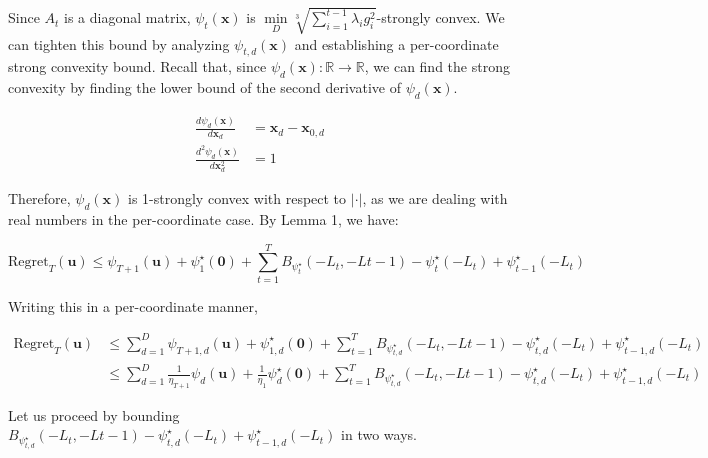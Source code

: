 \documentclass{article}
\newcommand{\R}{\mathbb{R}}
\newcommand{\Regret}{\text{Regret}}
\newcommand{\bx}{\mathbf{x}}
\newcommand{\bu}{\mathbf{u}}
\begin{document}
Since $A_t$ is a diagonal matrix, $\psi_t(\bx)$ is $\min\limits_{D} \sqrt[3]{\sum\limits_{i=1}^{t-1} \lambda_i
g_{i}^2}$-strongly convex. We can tighten this bound by analyzing $\psi_{t,d}(\bx)$ and establishing a per-coordinate
strong convexity bound. Recall that, since $\psi_d(\bx): \R \rightarrow \R$, we can find the strong convexity by finding
the lower bound of the second derivative of $\psi_d(\bx)$.

\begin{align*}
  \frac{d \psi_d(\bx)}{d \bx_d} &= \bx_d - \bx_{0,d} \\
  \frac{d^2 \psi_d(\bx)}{d \bx_d^2} &= 1
\end{align*}

Therefore, $\psi_d(\bx)$ is 1-strongly convex with respect to $| \cdot |$, as we are dealing with real numbers in the
per-coordinate case. By Lemma 1, we have:

\[
  \Regret_T(\bu) \leq \psi_{T+1}(\bu) + \psi_{1}^\star (\textbf{0}) + \sum\limits_{t=1}^T B_{\psi_{t}^\star}(-L_t,
  -L{t-1}) - \psi_{t}^\star (-L_t) + \psi_{t-1}^\star(-L_t)
\]

Writing this in a per-coordinate manner,

\begin{align*}
  \Regret_T(\bu) 
  &\leq \sum\limits_{d=1}^D \psi_{T+1,d}(\bu) + \psi_{1,d}^\star (\textbf{0}) + \sum\limits_{t=1}^T
  B_{\psi_{t,d}^\star}(-L_t, -L{t-1}) - \psi_{t,d}^\star (-L_t) + \psi_{t-1,d}^\star(-L_t) \\
  &\leq \sum\limits_{d=1}^D \frac{1}{\eta_{T+1}}\psi_{d}(\bu) + \frac{1}{\eta_1}\psi_{d}^\star (\textbf{0}) + \sum\limits_{t=1}^T
  B_{\psi_{t,d}^\star}(-L_t, -L{t-1}) - \psi_{t,d}^\star (-L_t) + \psi_{t-1,d}^\star(-L_t)
\end{align*}

Let us proceed by bounding $B_{\psi_{t,d}^\star}(-L_t, -L{t-1}) - \psi_{t,d}^\star (-L_t) + \psi_{t-1,d}^\star(-L_t)$ in
two ways.
\end{document}
